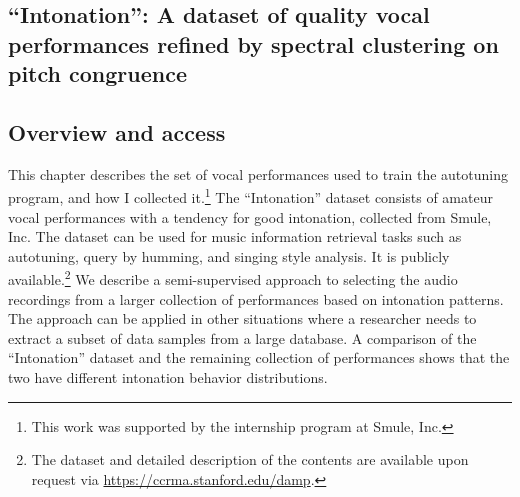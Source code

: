 \begin{appendices}



\chapter{``Intonation'': A dataset of quality vocal performances refined by spectral clustering on pitch congruence}
\label{chap:thesis-damp}
\section{Overview and access}
This chapter describes the set of vocal performances used to train the autotuning program, and how I collected it.\footnote{This work was supported by the internship program at Smule, Inc.} The ``Intonation'' dataset consists of amateur vocal performances with a tendency for good intonation, collected from Smule, Inc. The dataset can be used for music information retrieval tasks such as autotuning, query by humming, and singing style analysis. It is publicly available.\footnote{The dataset and detailed description of the contents are available upon request via \url{https://ccrma.stanford.edu/damp}.} We describe a semi-supervised approach to selecting the audio recordings from a larger collection of performances based on intonation patterns. The approach can be applied in other situations where a researcher needs to extract a subset of data samples from a large database. A comparison of the ``Intonation'' dataset and the remaining collection of performances shows that the two have different intonation behavior distributions. 


\end{appendices}
